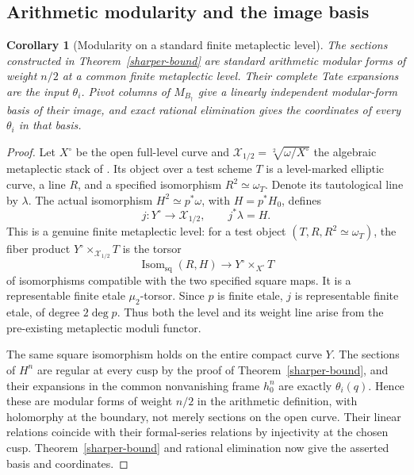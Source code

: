 \documentclass[11pt]{article}
\newtheorem{corollary}[theorem]{Corollary}
\theoremstyle{remark}\newtheorem{remark}[theorem]{Remark}
\begin{document}
\subsection{Arithmetic modularity and the image basis}
\begin{corollary}[Modularity on a standard finite metaplectic level]
\label{arithmetic-modularity}
The sections constructed in Theorem~\ref{sharper-bound} are standard
arithmetic modular forms of weight $n/2$ at a common finite metaplectic
level. Their complete Tate expansions are the input $\theta_i$.
Pivot columns of $M_{B_\dagger}$ give a linearly independent
modular-form basis of their image, and exact rational elimination gives
the coordinates of every $\theta_i$ in that basis.
\end{corollary}
\begin{proof}
Let $X^\circ$ be the open full-level curve and
$\mathcal X_{1/2}=\sqrt[2]{\omega/X^\circ}$ the algebraic metaplectic
stack of \cite[Definition 3.1.1]{candelori}. Its object over a test
scheme $T$ is a level-marked elliptic curve, a line $R$, and a specified
isomorphism $R^2\simeq\omega_T$. Denote its tautological line by
$\lambda$. The actual isomorphism
$H^2\simeq p^*\omega$, with $H=p^*H_0$, defines
\[
 j:Y^\circ\longrightarrow\mathcal X_{1/2},\qquad j^*\lambda=H.
\]
This is a genuine finite metaplectic level: for a test object
$(T,R,R^2\simeq\omega_T)$, the fiber product
$Y^\circ\times_{\mathcal X_{1/2}}T$ is the torsor
\[
 \operatorname{Isom}_{\mathrm{sq}}(R,H)
       \longrightarrow Y^\circ\times_{X^\circ}T
\]
of isomorphisms compatible with the two specified square maps.
It is a representable finite etale $\mu_2$-torsor. Since $p$ is finite
etale, $j$ is representable finite etale, of degree $2\deg p$.
Thus both the level and its weight line arise from the pre-existing
metaplectic moduli functor.

The same square isomorphism holds on the entire compact curve $Y$.
The sections of $H^n$ are regular at every cusp by the proof of
Theorem~\ref{sharper-bound}, and their expansions in the common
nonvanishing frame $h_0^n$ are exactly $\theta_i(q)$. Hence these are
modular forms of weight $n/2$ in the arithmetic definition, with
holomorphy at the boundary, not merely sections on the open curve.
Their linear relations coincide with their formal-series relations
by injectivity at the chosen cusp. Theorem~\ref{sharper-bound} and
rational elimination now give the asserted basis and coordinates.
\end{proof}
\end{document}
